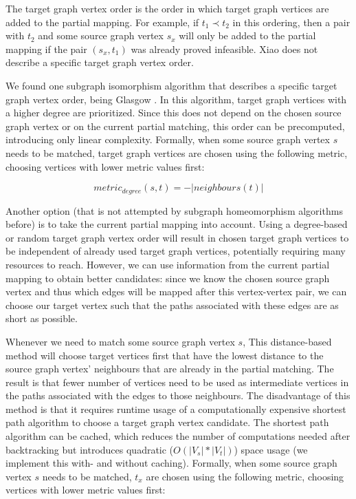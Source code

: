 The target graph vertex order is the order in which target graph vertices are added to the partial mapping. For example, if $t_1 \prec t_2$ in this ordering, then a pair with $t_2$ and some source graph vertex $s_x$ will only be added to the partial mapping if the pair $(s_x, t_1)$ was already proved infeasible. Xiao does not describe a specific target graph vertex order.

We found one subgraph isomorphism algorithm that describes a specific target graph vertex order, being Glasgow \cite{McCreesh2015}. In this algorithm, target graph vertices with a higher degree are prioritized. Since this does not depend on the chosen source graph vertex or on the current partial matching, this order can be precomputed, introducing only linear complexity. Formally, when some source graph vertex $s$ needs to be matched, target graph vertices are chosen using the following metric, choosing vertices with lower metric values first:

$$\mathit{metric}_\mathit{degree}(s, t)=-|\mathit{neighbours}(t)|$$

Another option (that is not attempted by subgraph homeomorphism algorithms before) is to take the current partial mapping into account. Using a degree-based or random target graph vertex order will result in chosen target graph vertices to be independent of already used target graph vertices, potentially requiring many resources to reach. However, we can use information from the current partial mapping to obtain better candidates: since we know the chosen source graph vertex and thus which edges will be mapped after this vertex-vertex pair, we can choose our target vertex such that the paths associated with these edges are as short as possible.

Whenever we need to match some source graph vertex $s$, This distance-based method will choose target vertices first that have the lowest distance to the source graph vertex' neighbours that are already in the partial matching. The result is that fewer number of vertices need to be used as intermediate vertices in the paths associated with the edges to those neighbours. The disadvantage of this method is that it requires runtime usage of a computationally expensive shortest path algorithm to choose a target graph vertex candidate. The shortest path algorithm can be cached, which reduces the number of computations needed after backtracking but introduces quadratic ($O(|V_s|*|V_t|)$) space usage (we implement this with- and without caching). Formally, when some source graph vertex $s$ needs to be matched, $t_x$ are chosen using the following metric, choosing vertices with lower metric values first:


